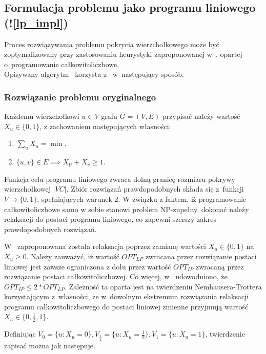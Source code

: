 \subsection{Formulacja problemu jako programu liniowego (!\ref{lp_impl})}\label{section_kernelization_lp_formulation}

Proces rozwiązywania problemu pokrycia wierzchołkowego może być zoptymalizowany
przy zastosowaniu heurystyki zaproponowanej w~\cite{hochbaum82}, opartej 
o~programowanie całkowitoliczbowe. \\
Opisywany algorytm~\cite[rozdz.~4.2.2]{abukhzam03} korzysta z~\cite{hochbaum82} 
w~następujący sposób.

\subsubsection{\textbf{Rozwiązanie problemu oryginalnego}}\label{ss_lp_original}

Każdemu wierzchołkowi $u \in V$ grafu $G=(V,E)$ przypisać należy wartość $X_u
\in \{0, 1\}$, z zachowaniem następujących własności:
\begin{enumerate}
  \item $\sum_{u}X_u = \min$,
  \item $\{u,v\} \in E \implies X_U + X_v \geq 1$.
\end{enumerate}

Funkcja celu programu liniowego zwraca dolną granicę rozmiaru pokrywy 
wierzchołkowej $|VC|$.
Zbiór rozwiązań prawdopodobnych składa się z~funkcji $V \to \{0, 1\}$,
spełniających warunek 2.
W związku z faktem, iż programowanie całkowitoliczbowe samo w sobie stanowi
problem NP-zupełny, dokonać należy relaksacji do postaci programu liniowego, co
zapewni szerszy zakres prawdopodobnych rozwiązań.

W~\cite{khuller02} zaproponowana została relaksacja poprzez zamianę wartości 
$X_u \in \{0,1\}$ na $X_u \geq 0$.
Należy zauważyć, iż wartość $OPT_{LP}$ zwracana przez rozwiązanie postaci 
liniowej jest zawsze ograniczona z dołu przez wartość $OPT_{IP}$ zwracaną przez 
rozwiązanie postaci całkowitoliczbowej.
Co więcej, w~\cite{khuller02} udowodniono, że $OPT_{IP} \leq 2*OPT_{LP}$.
Zależność ta oparta jest na twierdzeniu Nemhausera-Trottera korzystającym
z~własności, że w~dowolnym ekstremum rozwiązania relaksacji programu
całkowitoliczbowego do postaci liniowej zmienne przyjmują wartość 
$X_u \in \{0, \frac{1}{2}, 1\}$.

Definiując $V_0 = \{u : X_u=0\}, V_{\frac{1}{2}}=\{u: X_u=\frac{1}{2}\},
V_1=\{u: X_u=1\}$, twierdzenie zapisać można jak następuje.

